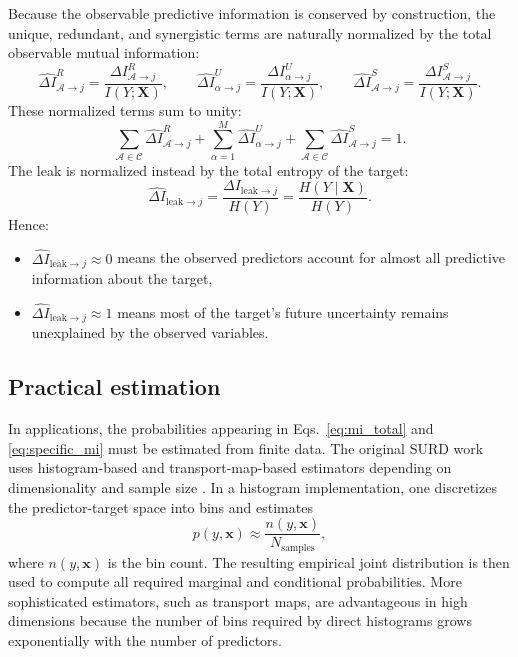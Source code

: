 \documentclass[12pt, a4paper]{article}
\begin{document}
Because the observable predictive information is conserved by construction, the unique, redundant, and synergistic terms are naturally normalized by the total observable mutual information:
\begin{equation}
\widehat{\Delta I}_{\mathcal{A}\to j}^{R}
=
\frac{\Delta I_{\mathcal{A}\to j}^{R}}{I(Y;\mathbf{X})},
\qquad
\widehat{\Delta I}_{\alpha\to j}^{U}
=
\frac{\Delta I_{\alpha\to j}^{U}}{I(Y;\mathbf{X})},
\qquad
\widehat{\Delta I}_{\mathcal{A}\to j}^{S}
=
\frac{\Delta I_{\mathcal{A}\to j}^{S}}{I(Y;\mathbf{X})}.
\label{eq:normalized_atoms}
\end{equation}
These normalized terms sum to unity:
\begin{equation}
\sum_{\mathcal{A}\in\mathcal{C}}\widehat{\Delta I}_{\mathcal{A}\to j}^{R}
+
\sum_{\alpha=1}^{M}\widehat{\Delta I}_{\alpha\to j}^{U}
+
\sum_{\mathcal{A}\in\mathcal{C}}\widehat{\Delta I}_{\mathcal{A}\to j}^{S}
=1.
\end{equation}
The leak is normalized instead by the total entropy of the target:
\begin{equation}
\widehat{\Delta I}_{\mathrm{leak}\to j}
=
\frac{\Delta I_{\mathrm{leak}\to j}}{H(Y)}
=
\frac{H(Y\mid\mathbf{X})}{H(Y)}.
\label{eq:normalized_leak}
\end{equation}
Hence:
\begin{itemize}
    \item \(\widehat{\Delta I}_{\mathrm{leak}\to j}\approx 0\) means the observed predictors account for almost all predictive information about the target,
    \item \(\widehat{\Delta I}_{\mathrm{leak}\to j}\approx 1\) means most of the target's future uncertainty remains unexplained by the observed variables.
\end{itemize}

\subsection{Practical estimation}

In applications, the probabilities appearing in Eqs.~\eqref{eq:mi_total} and \eqref{eq:specific_mi} must be estimated from finite data. The original SURD work uses histogram-based and transport-map-based estimators depending on dimensionality and sample size \cite{MartinezSanchez2024SURD}. In a histogram implementation, one discretizes the predictor-target space into bins and estimates
\begin{equation}
p(y,\mathbf{x}) \approx \frac{n(y,\mathbf{x})}{N_{\mathrm{samples}}},
\end{equation}
where \(n(y,\mathbf{x})\) is the bin count. The resulting empirical joint distribution is then used to compute all required marginal and conditional probabilities. More sophisticated estimators, such as transport maps, are advantageous in high dimensions because the number of bins required by direct histograms grows exponentially with the number of predictors.
\end{document}
